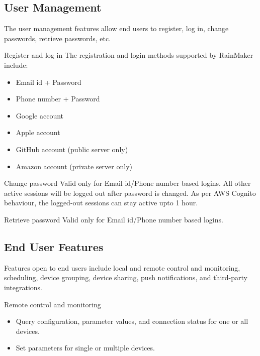\documentclass[a4paper,12pt]{book}
\begin{document}
\subsection{User Management}
The user management features allow end users to register, log in, change passwords, retrieve passwords, etc.

\begin{term}{Register and log in}
    The registration and login methods supported by RainMaker include:

    \begin{itemize}
        \item Email id + Password
        \item Phone number + Password
        \item Google account
        \item Apple account
        \item GitHub account (public server only)
        \item Amazon account (private server only)
    \end{itemize}
\end{term}


\begin{term}{Change password}
    Valid only for Email id/Phone number based logins. All other active sessions will be logged out after password is changed. As per AWS Cognito behaviour, the logged-out sessions can stay active upto 1 hour.
\end{term}

\begin{term}{Retrieve password}
    Valid only for Email id/Phone number based logins.
\end{term}

\subsection{End User Features}
Features open to end users include local and remote control and monitoring, scheduling, device grouping, device sharing, push notifications, and third-party integrations.

\begin{term}{Remote control and monitoring}
    \begin{itemize}
        \item Query configuration, parameter values, and connection status for one or all devices.
        \item Set parameters for single or multiple devices.
    \end{itemize}
\end{term}
\end{document}
